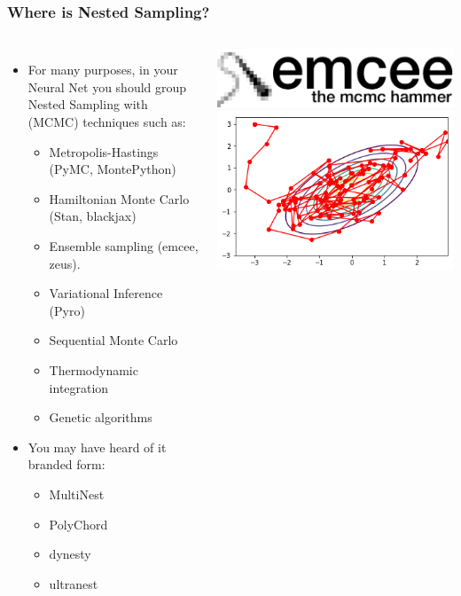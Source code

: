 \documentclass[aspectratio=169]{beamer}
\begin{document}
\begin{frame}
    \frametitle{Where is Nested Sampling?}
    \begin{columns}
        \begin{itemize}
            \item For many purposes, in your Neural Net you should group Nested Sampling with (MCMC) techniques such as:
                \begin{itemize}
                    \item Metropolis-Hastings (PyMC, MontePython)
                    \item Hamiltonian Monte Carlo (Stan, blackjax)
                    \item Ensemble sampling (emcee, zeus). 
                    \item Variational Inference (Pyro)
                    \item Sequential Monte Carlo 
                    \item Thermodynamic integration
                    \item Genetic algorithms
                \end{itemize}
            \item You may have heard of it branded form:
                \begin{itemize}
                    \item MultiNest
                    \item PolyChord
                    \item dynesty
                    \item ultranest
                \end{itemize}
            \end{itemize}
        \begin{columns}
        \includegraphics[width=\textwidth]{figures/emcee}
        \includegraphics[width=\textwidth]{figures/metropolis-hastings}

\end{columns}
\end{columns}
\end{frame}
\end{document}
